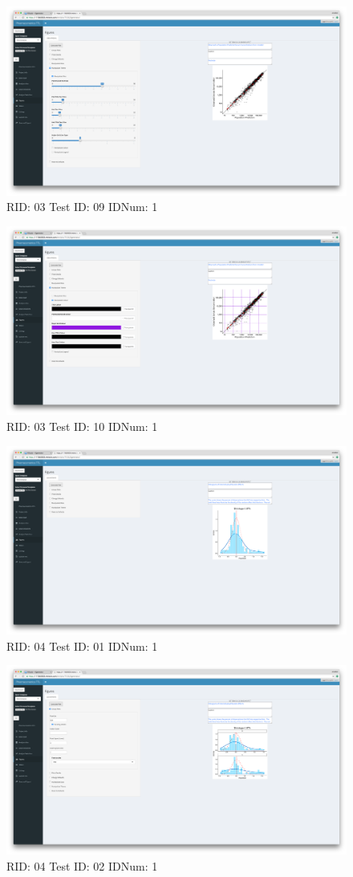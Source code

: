 \begin{figure}[H]
\includegraphics[width=.8\textwidth]{screencaps/03-09-1.png}
\caption{RID: 03 Test ID: 09 IDNum: 1}
\end{figure}
\begin{figure}[H]
\includegraphics[width=.8\textwidth]{screencaps/03-10-1.png}
\caption{RID: 03 Test ID: 10 IDNum: 1}
\end{figure}
\begin{figure}[H]
\includegraphics[width=.8\textwidth]{screencaps/04-01-1.png}
\caption{RID: 04 Test ID: 01 IDNum: 1}
\end{figure}
\begin{figure}[H]
\includegraphics[width=.8\textwidth]{screencaps/04-02-1.png}
\caption{RID: 04 Test ID: 02 IDNum: 1}
\end{figure}

